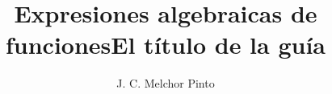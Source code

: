 \documentclass[12pt,addpoints,answers]{guia}
\title{Expresiones algebraicas de funciones}
\title{El título de la guía}
\author{J. C. Melchor Pinto}
\begin{document}
\pagestyle{headandfoot}

\INFO
\vspace{-0.5cm}
\begin{multicols}{2}
    
    \columnbreak
    
    
    
\end{multicols}

\begin{questions}
    \questionboxed[20]{}
    \questionboxed[20]{}
    \questionboxed[20]{}
    \questionboxed[20]{}
    \questionboxed[20]{}
\end{questions}
\end{document}
